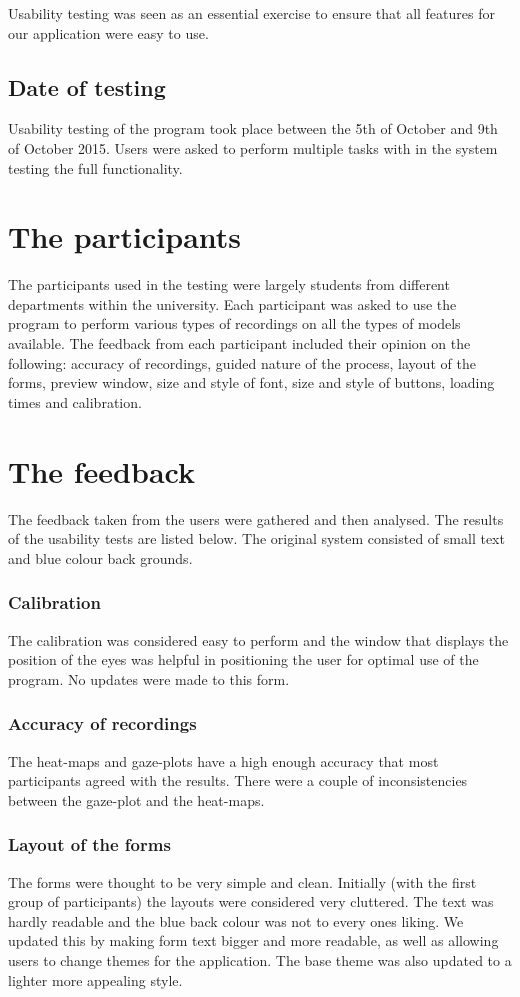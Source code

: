 Usability testing was seen as an essential exercise to ensure that all features for our application were easy to use. 

\subsection{Date of testing}
Usability testing of the program took place between the 5th of October and 9th of October 2015. Users were asked to perform multiple tasks with in the system testing the full functionality. 

\section{The participants}
The participants used in the testing were largely students from different departments within the university. Each participant was asked to use the program to perform various types of recordings on all the types of models available. The feedback from each participant included their opinion on the following: accuracy of recordings, guided nature of the process, layout of the forms, preview window, size and style of font, size and style of buttons, loading times and calibration.

\section{The feedback}
The feedback taken from the users were gathered and then analysed. The results of the usability tests are listed below. The original system consisted of small text and blue colour back grounds.

\subsubsection{Calibration}
The calibration was considered easy to perform and the window that displays the position of the eyes was helpful in positioning the user for optimal use of the program. No updates were made to this form.

\subsubsection{Accuracy of recordings}
The heat-maps and gaze-plots have a high enough accuracy that most participants agreed with the results. There were a couple of inconsistencies between the gaze-plot and the heat-maps.

\subsubsection{Layout of the forms}
The forms were thought to be very simple and clean. Initially (with the first group of participants) the layouts were considered very cluttered. The text was hardly readable and the blue back colour was not to every ones liking. We updated this by making form text bigger and more readable, as well as allowing users to change themes for the application. The base theme was also updated to a lighter more appealing style.

